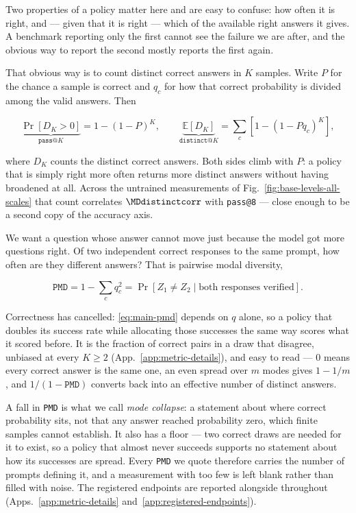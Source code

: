 \documentclass{article}
\newcommand{\1}{\mathbf 1}
\newcommand{\E}{\mathbb E}
\newcommand{\pmd}{\texttt{PMD}}
\theoremstyle{remark}
\theoremstyle{definition}
\theoremstyle{plain}
\begin{document}
Two properties of a policy matter here and are easy to confuse: how often it is
right, and --- given that it is right --- which of the available right answers
it gives. A benchmark reporting only the first cannot see the failure we are
after, and the obvious way to report the second mostly reports the first again.

That obvious way is to count distinct correct answers in $K$ samples. Write $P$
for the chance a sample is correct and $q_c$ for how that correct probability is
divided among the valid answers. Then

\begin{equation}
 \underbrace{\Pr[D_K>0]}_{\texttt{pass@}K}=1-(1-P)^K,
 \qquad
 \underbrace{\E[D_K]}_{\texttt{distinct@}K}
 =\sum_c[1-(1-Pq_c)^K],
 \label{eq:main-occupancy}
\end{equation}

where $D_K$ counts the distinct correct answers. Both sides climb with $P$: a
policy that is simply right more often returns more distinct answers without
having broadened at all. Across the \MDcells{} untrained measurements of
Fig.~\ref{fig:base-levels-all-scales} that count correlates
$\MDdistinctcorr$ with \texttt{pass@8} --- close enough to be a second copy of
the accuracy axis.

We want a question whose answer cannot move just because the model got more
questions right. Of two independent correct responses to the same prompt, how
often are they different answers? That is pairwise modal diversity,

\begin{equation}
 \pmd = 1-\sum_c q_c^2
 = \Pr[Z_1\ne Z_2\mid \text{both responses verified}].
 \label{eq:main-pmd}
\end{equation}

Correctness has cancelled: \eqref{eq:main-pmd} depends on $q$ alone, so a policy
that doubles its success rate while allocating those successes the same way
scores what it scored before. It is the fraction of correct pairs in a draw that
disagree, unbiased at every $K\ge2$ (App.~\ref{app:metric-details}), and easy
to read --- $0$ means every correct answer is the same one, an even spread over
$m$ modes gives $1-1/m$, and $1/(1-\pmd{})$ converts back into an effective
number of distinct answers.

A fall in \pmd{} is what we call \emph{mode collapse}: a statement about where
correct probability sits, not that any answer reached probability zero, which
finite samples cannot establish. It also has a floor --- two correct draws are
needed for it to exist, so a policy that almost never succeeds supports no
statement about how its successes are spread. Every \pmd{} we quote therefore
carries the number of prompts defining it, and a measurement with too few is
left blank rather than filled with noise. The registered endpoints are reported
alongside throughout (Apps.~\ref{app:metric-details}
and~\ref{app:registered-endpoints}).
\end{document}
